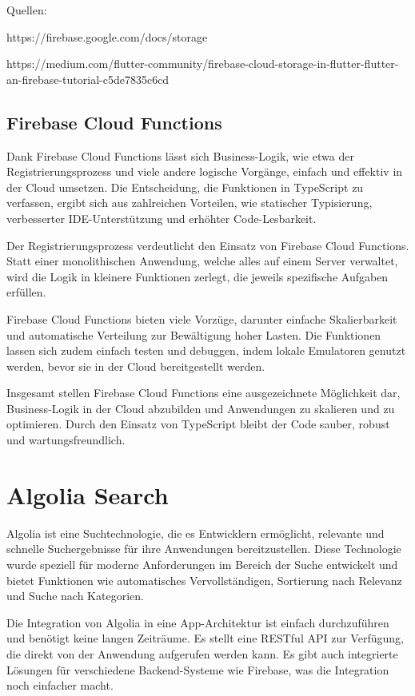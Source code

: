 Quellen:

https://firebase.google.com/docs/storage

https://medium.com/flutter-community/firebase-cloud-storage-in-flutter-flutter-an-firebase-tutorial-c5de7835c6cd

\subsection{Firebase Cloud Functions}
Dank Firebase Cloud Functions\cite{firebase-cloud-functions} lässt sich Business-Logik, wie etwa der Registrierungsprozess und viele andere logische Vorgänge, einfach und effektiv in der Cloud umsetzen. Die Entscheidung, die Funktionen in TypeScript zu verfassen, ergibt sich aus zahlreichen Vorteilen, wie statischer Typisierung, verbesserter IDE-Unterstützung und erhöhter Code-Lesbarkeit.

Der Registrierungsprozess verdeutlicht den Einsatz von Firebase Cloud Functions. Statt einer monolithischen Anwendung, welche alles auf einem Server verwaltet, wird die Logik in kleinere Funktionen zerlegt, die jeweils spezifische Aufgaben erfüllen.

Firebase Cloud Functions bieten viele Vorzüge, darunter einfache Skalierbarkeit und automatische Verteilung zur Bewältigung hoher Lasten. Die Funktionen lassen sich zudem einfach testen und debuggen, indem lokale Emulatoren genutzt werden, bevor sie in der Cloud bereitgestellt werden.

Insgesamt stellen Firebase Cloud Functions eine ausgezeichnete Möglichkeit dar, Business-Logik in der Cloud abzubilden und Anwendungen zu skalieren und zu optimieren. Durch den Einsatz von TypeScript bleibt der Code sauber, robust und wartungsfreundlich.

\section{Algolia Search}\label{sec:algolia}
Algolia ist eine Suchtechnologie, die es Entwicklern ermöglicht, relevante und schnelle Suchergebnisse für ihre Anwendungen bereitzustellen. Diese Technologie wurde speziell für moderne Anforderungen im Bereich der Suche entwickelt und bietet Funktionen wie automatisches Vervollständigen, Sortierung nach Relevanz und Suche nach Kategorien.

Die Integration von Algolia in eine App-Architektur ist einfach durchzuführen und benötigt keine langen Zeiträume. Es stellt eine RESTful API zur Verfügung, die direkt von der Anwendung aufgerufen werden kann. Es gibt auch integrierte Lösungen für verschiedene Backend-Systeme wie Firebase, was die Integration noch einfacher macht.

